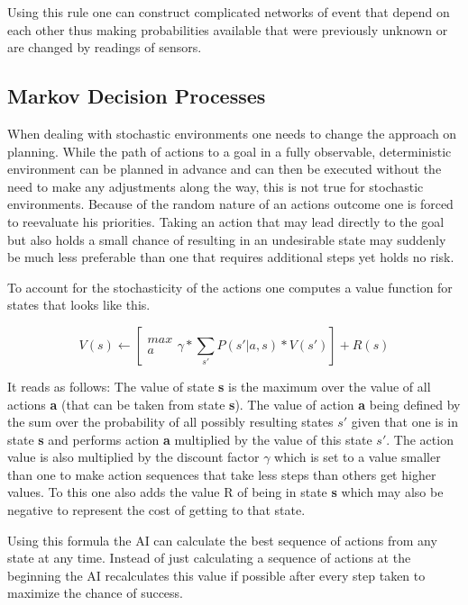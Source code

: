 Using this rule one can construct complicated networks of event that depend on each other thus making probabilities available that were previously unknown or are changed by readings of sensors.

\subsection{Markov Decision Processes}

When dealing with stochastic environments one needs to change the approach on planning. While the path of actions to a goal in a fully observable, deterministic environment can be planned in advance and can then be executed without the need to make any adjustments along the way, this is not true for stochastic environments. Because of the random nature of an actions outcome one is forced to reevaluate his priorities. Taking an action that may lead directly to the goal but also holds a small chance of resulting in an undesirable state may suddenly be much less preferable than one that requires additional steps yet holds no risk.

To account for the stochasticity of the actions one computes a value function for states that looks like this.

\[V(s) \leftarrow \left [\begin{matrix} max \\ a \end{matrix} \gamma * \sum_{s'} P(s'|a,s)* V(s')  \right ]+R(s)\]

It reads as follows: The value of state {\bf s} is the maximum over the value of all actions {\bf a} (that can be taken from state {\bf s}). The value of action {\bf a} being defined by the sum over the probability of all possibly resulting states {\bf $s'$} given that one is in state {\bf s} and performs action {\bf a} multiplied by the value of this state {\bf $s'$}. The action value is also multiplied by the discount factor $\gamma$  which is set to a value smaller than one to make action sequences that take less steps than others get higher values. To this one also adds the value R of being in state {\bf s} which may also be negative to represent the cost of getting to that state.

Using this formula the AI can calculate the best sequence of actions from any state at any time. Instead of just calculating a sequence of actions at the beginning the AI recalculates this value if possible after every step taken to maximize the chance of success.

